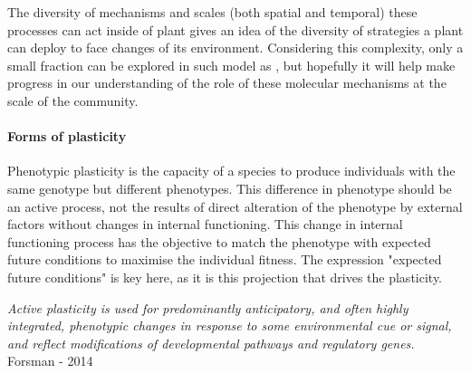 \begin{fullwidth}
\begin{tcolorbox}[title=Molecular basis of phenotypic plasticity]

The diversity of mechanisms and scales (both spatial and temporal) these processes can act inside of plant gives an idea of the diversity of strategies a plant can deploy to face changes of its environment. Considering this complexity, only a small fraction can be explored in such model as \model, but hopefully it will help make progress in our understanding of the role of these molecular mechanisms at the scale of the community.
\end{tcolorbox}
\end{fullwidth}






\paragraph{Forms of plasticity}
Phenotypic plasticity is the capacity of a species to produce individuals with the same genotype but different phenotypes. This difference in phenotype should be an active process, not the results of direct alteration of the phenotype by external factors without changes in internal functioning. This change in internal functioning process has the objective  to match the phenotype with expected future conditions to maximise the individual fitness. The expression "expected future conditions" is key here, as it is this projection that drives the plasticity.

\textit{Active plasticity is used for predominantly anticipatory, and often highly integrated, phenotypic changes in response to some environmental cue or signal, and reflect modifications of developmental pathways and regulatory genes.} Forsman - 2014\\


